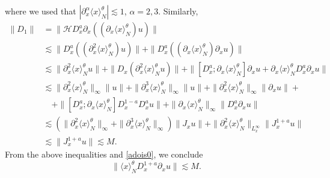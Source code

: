 \documentclass[reqno]{amsart}
\newcommand{\D}{D^{a}}
\newcommand{\h}{\mathcal H}
\newcommand{\la}{\langle x \rangle_{N}}
\numberwithin{equation}{section}
\begin{document}
where we used that $|\partial_x^\alpha\la^\theta|\lesssim 1$, $\alpha=2,3$. Similarly,
\begin{equation*}
\begin{split}
\|D_1\|&=\|\h \D_x \partial_{x}((\partial_x \la^{\theta}) u)\|\\
       &\lesssim\|\D_x((\partial_{x}^2 \la^{\theta})u)\|+\|\D_x((\partial_x \la^{\theta})\partial_x u)\|\\
       &\lesssim  \|\partial_{x}^2 \la^{\theta} u\|+\|D_x(\partial_{x}^2 \la^{\theta} u)\|+\|[\D_x;\partial_x \la^{\theta}]\partial_x u + \partial_{x}\la^{\theta} \D_x \partial_{x}u\|\\
      & \lesssim  \|\partial_{x}^2 \la^{\theta}\|_{\infty}\|u\|+\|\partial_{x}^3 \la^{\theta}\|_{\infty}\|u\|+\|\partial_{x}^2 \la^{\theta}\|_\infty \|\partial_x u\| +\\
      & \quad + \|[\D_x;\partial_x \la^{\theta}]D^{1-a}_x D^{a}_x u\|+\|\partial_x \la^{\theta}\|_\infty \|\D_x \partial_x u\|\\
      & \lesssim  \left(\|\partial_{x}^2 \la^{\theta}\|_{\infty}+\|\partial_{x}^3 \la^{\theta}\|_{\infty} \right)\|J_x u\|+\| \partial_{x}^2 \la^{\theta}\|_{L^\infty_{x}} \|J_x^{1+a} u\|\\
      & \lesssim  \|J_x^{1+a} u\|\lesssim M.
\end{split}
\end{equation*}
From the above inequalities and \eqref{adois0}, we conclude
\begin{equation}\label{adois2}
\|\langle x \rangle_{N}^{\theta}D^{1+a}_x\partial_{x}u\|\lesssim M.
\end{equation}
\end{document}
